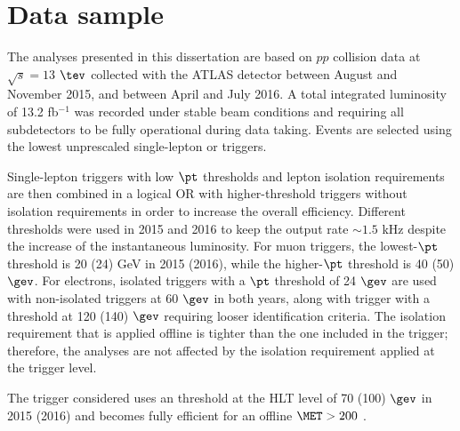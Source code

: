 \section{Data sample}
\label{chp:sec:data}

The analyses presented in this dissertation are based on $pp$ collision data at $\sqrt{s}= 13$ $\tev$ collected 
with the ATLAS detector between August and November 2015, and between April and July 2016. A total integrated luminosity of 13.2 fb$^{-1}$
was recorded under stable beam conditions and requiring all subdetectors to be fully operational during data taking. Events are selected using the lowest unprescaled single-lepton or \MET triggers.\par
Single-lepton triggers with low $\pt$ thresholds and lepton isolation requirements are then combined in a logical OR with higher-threshold triggers without isolation requirements in order to increase the overall efficiency. Different thresholds were used in 2015 and 2016 to keep the output rate $\sim1.5$ kHz despite the increase of the instantaneous luminosity. For muon triggers, the lowest-$\pt$ threshold is 20 (24) GeV in 2015 (2016), while the higher-$\pt$ threshold is 40 (50) $\gev$. For electrons, isolated triggers with a $\pt$ threshold of 24 $\gev$ are used with non-isolated triggers at 60 $\gev$ in both years, along with trigger with a threshold at 120 (140) $\gev$ requiring looser identification criteria. 
The isolation requirement that is applied offline is tighter than the one included in the trigger; therefore, the analyses are not affected by the isolation requirement applied at the trigger level.

The \MET trigger \cite{ATL-DAQ-PUB-2016-001} considered uses an \MET threshold at the HLT level of 70 (100) $\gev$ in 2015 (2016) and becomes fully efficient for an offline $\MET>200$ \gev.

